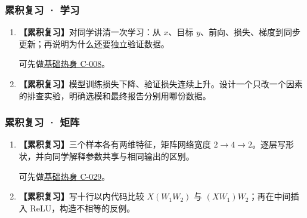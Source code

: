 \subsubsection*{累积复习 · 学习}
\begin{enumerate}[label={},leftmargin=4.8em,itemsep=4pt]
\item[\textbf{R-01.}] \leavevmode{}\label{exercise:R-01}\label{exercise:review-learning-cycle}\textbf{【累积复习】}对同学讲清一次学习：从 $x$、目标 $y$、前向、损失、梯度到同步更新；再说明为什么还要独立验证数据。\par 可先做\hyperref[exercise:synchronous-gradient-step]{基础热身 C-008}。
\item[\textbf{R-02.}] \leavevmode{}\label{exercise:R-02}\label{exercise:review-validation-experiment}\textbf{【累积复习】}模型训练损失下降、验证损失连续上升。设计一个只改一个因素的排查实验，明确选模和最终报告分别用哪份数据。
\end{enumerate}
\subsubsection*{累积复习 · 矩阵}
\begin{enumerate}[label={},leftmargin=4.8em,itemsep=4pt]
\item[\textbf{R-03.}] \leavevmode{}\label{exercise:R-03}\label{exercise:review-matrix-shapes}\textbf{【累积复习】}三个样本各有两维特征，矩阵网络宽度 $2\to4\to2$。逐层写形状，并向同学解释参数共享与相同输出的区别。\par 可先做\hyperref[exercise:matrix-batch-calculation]{基础热身 C-029}。
\item[\textbf{R-04.}] \leavevmode{}\label{exercise:R-04}\label{exercise:review-matrix-nonlinearity}\textbf{【累积复习】}写十行以内代码比较 $X(W_1W_2)$ 与 $(XW_1)W_2$；再在中间插入 ReLU，构造不相等的反例。
\end{enumerate}
